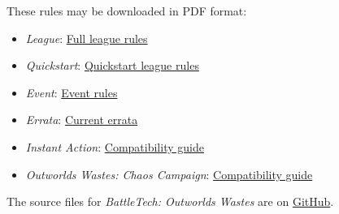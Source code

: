 
These rules may be downloaded in PDF format:


\begin{itemize}

\item \emph{League}: \href{https://raw.githubusercontent.com/Eudicods/outworlds-wastes/rules-pdf/battletech-outworlds-wastes.pdf}{Full league rules}

\item \emph{Quickstart}: \href{https://raw.githubusercontent.com/Eudicods/outworlds-wastes/rules-pdf/battletech-outworlds-wastes-quickstart.pdf}{Quickstart league rules}

\item \emph{Event}: \href{https://raw.githubusercontent.com/Eudicods/outworlds-wastes/rules-pdf/battletech-outworlds-wastes-event.pdf}{Event rules}

\item \emph{Errata}: \href{https://raw.githubusercontent.com/Eudicods/outworlds-wastes/rules-pdf/battletech-outworlds-wastes-errata.pdf}{Current errata}

\item \emph{Instant Action}: \href{https://raw.githubusercontent.com/Eudicods/outworlds-wastes/rules-pdf/battletech-outworlds-wastes-instant-action.pdf}{Compatibility guide}

\item \emph{Outworlds Wastes: Chaos Campaign}: \href{https://raw.githubusercontent.com/Eudicods/outworlds-chaos/rules-pdf/battletech-outworlds-chaos.pdf}{Compatibility guide}

\end{itemize}







The source files for \emph{BattleTech: Outworlds Wastes} are on \href{https://github.com/Eudicods/outworlds-wastes}{GitHub}.
